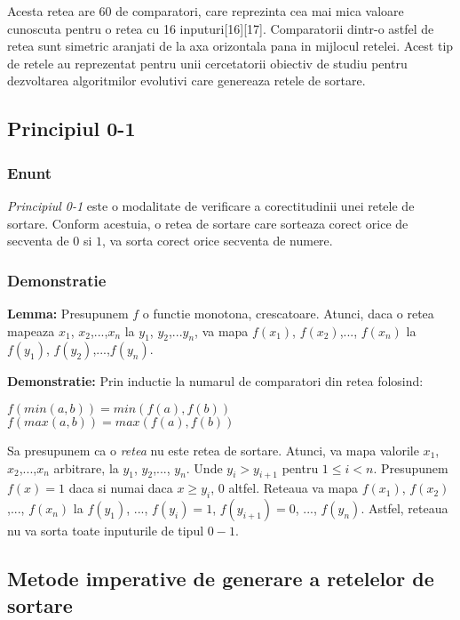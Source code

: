 \documentclass[12pt]{article}
\newenvironment{tightcenter}{%
  \setlength\topsep{0pt}
  \setlength\parskip{0pt}
  \begin{center}
}{%
  \end{center}
}
\begin{document}
Acesta retea are $60$ de comparatori, care reprezinta cea mai mica valoare cunoscuta pentru o retea cu 16 inputuri[16][17]. Comparatorii dintr-o astfel de retea sunt simetric aranjati de la axa orizontala pana in mijlocul retelei. Acest tip de retele au reprezentat pentru unii cercetatorii obiectiv de studiu pentru dezvoltarea algoritmilor evolutivi care genereaza retele de sortare. 

\subsection{Principiul 0-1}

\subsubsection{Enunt}
\textit{Principiul 0-1} este o modalitate de verificare a corectitudinii unei retele de sortare. Conform acestuia, o retea de sortare care sorteaza corect orice de secventa de $0$ si $1$, va sorta corect orice secventa de numere.

\subsubsection{Demonstratie}
\textbf{Lemma:} Presupunem $f$ o functie monotona, crescatoare. Atunci, daca o retea mapeaza $x_1$, $x_2$,...,$x_n$ la $y_1$, $y_2$,...$y_n$, va mapa $f(x_1)$, $f(x_2)$,..., $f(x_n)$ la $f(y_1)$, $f(y_2)$,...,$f(y_n)$. 

\textbf{Demonstratie:} Prin inductie la numarul de comparatori din retea folosind:
\begin{tightcenter} 
 $f(min(a, b)) = min(f(a), f(b))$\\
 $f(max(a, b)) = max(f(a), f(b))$\\
\end{tightcenter}

Sa presupunem ca o \textit{retea} nu este retea de sortare. Atunci, va mapa valorile $x_1$, $x_2$,...,$x_n$ arbitrare, la $y_1$, $y_2$,..., $y_n$. Unde $y_i > y_{i+1}$ pentru $1 \leq i  < n$. Presupunem $f(x) = 1$ daca si numai daca $x \geq y_i$, $0$ altfel. Reteaua va mapa $f(x_1)$, $f(x_2)$,..., $f(x_n)$ la $f(y_1)$, ..., $f(y_i)=1$, $f(y_{i+1})=0$, ..., $f(y_n)$. Astfel, reteaua nu va sorta toate inputurile de tipul $0-1$.


\subsection{Metode imperative de generare a retelelor de sortare}
\end{document}
